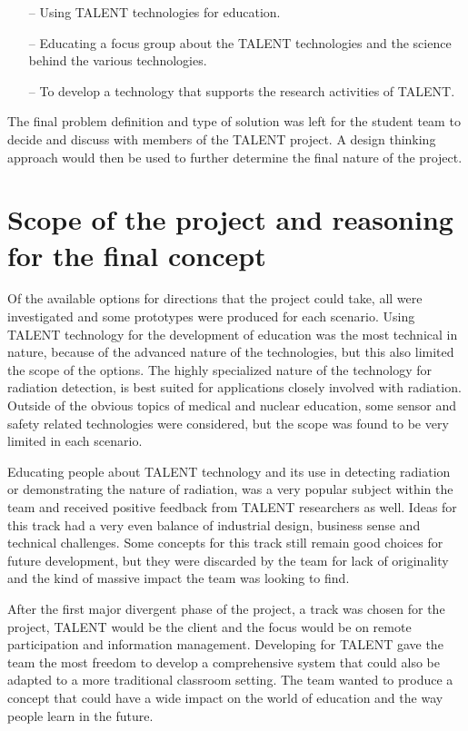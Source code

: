 \documentclass[english,12pt,a4paper,dvips]{article}
\begin{document}
\begin{itemize}
\item[--]Using TALENT technologies for education.
\item[--]Educating a focus group about the TALENT technologies and the science behind the various technologies.
\item[--]To develop a technology that supports the research activities of TALENT.
\end{itemize}

The final problem definition and type of solution was left for the student team to decide and discuss with members of the TALENT project. A design thinking approach would then be used to further determine the final nature of the project.

\clearpage

\section{Scope of the project and reasoning for the final concept}

Of the available options for directions that the project could take, all were investigated and some prototypes were produced for each scenario. Using TALENT technology for the development of education was the most technical in nature, because of the advanced nature of the technologies, but this also limited the scope of the options. The highly specialized nature of the technology for radiation detection, is best suited for applications closely involved with radiation. Outside of the obvious topics of medical and nuclear education, some sensor and safety related technologies were considered, but the scope was found to be very limited in each scenario.

Educating people about TALENT technology and its use in detecting radiation or demonstrating the nature of radiation, was a very popular subject within the team and received positive feedback from TALENT researchers as well. Ideas for this track had a very even balance of industrial design, business sense and technical challenges. Some concepts for this track still remain good choices for future development, but they were discarded by the team for lack of originality and the kind of massive impact the team was looking to find.

After the first major divergent phase of the project, a track was chosen for the project, TALENT would be the client and the focus would be on remote participation and information management. Developing for TALENT gave the team the most freedom to develop a comprehensive system that could also be adapted to a more traditional classroom setting. The team wanted to produce a concept that could have a wide impact on the world of education and the way people learn in the future. 
\end{document}
